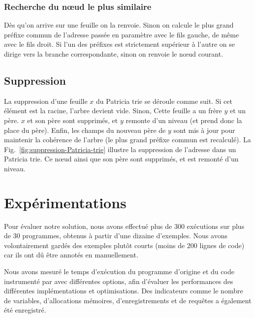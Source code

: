 \subsubsection*{Recherche du n\oe{}ud le plus similaire}

Dès qu'on arrive sur une feuille on la renvoie. Sinon on calcule le plus grand
préfixe commun de l'adresse passée en paramètre avec le fils gauche, de même
avec le fils droit. Si l'un des préfixes est strictement supérieur à l'autre
on se dirige vers la branche correspondante, sinon on renvoie le n\oe{}ud
courant.



\subsection{Suppression}





La suppression d'une feuille $x$ du Patricia trie se déroule comme suit. Si cet
élément est la racine, l'arbre devient vide. Sinon, Cette feuille a un frère $y$
et un père. $x$ et son père sont supprimés, et $y$ remonte d'un niveau (et prend
donc la place du père). Enfin, les champs du nouveau père de $y$ sont mis à jour
pour maintenir la cohérence de l'arbre (le plus grand préfixe commun est
recalculé). La Fig.~\ref{fig:suppression-Patricia-trie} illustre la suppression
de l'adresse  dans un Patricia trie. Ce n\oe{}ud
ainsi que son père  sont supprimés, et
 est remonté d'un niveau.


\section{Expérimentations}


Pour évaluer notre solution, nous avons effectué plus de 300 exécutions sur
plus de 30 programmes, obtenus à partir d'une dizaine d'exemples. Nous avons
volontairement gardés des exemples plutôt courts (moins de 200 lignes de code)
car ils ont dû être annotés en \acsl manuellement.

Nous avons mesuré le temps d'exécution du programme d'origine et du code
instrumenté par \eacsltoc avec différentes options, afin d'évaluer les
performances des différentes implémentations et optimisations. Des indicateurs
comme le nombre de variables, d'allocations mémoires, d'enregistrements et de
requêtes a également été enregistré.



